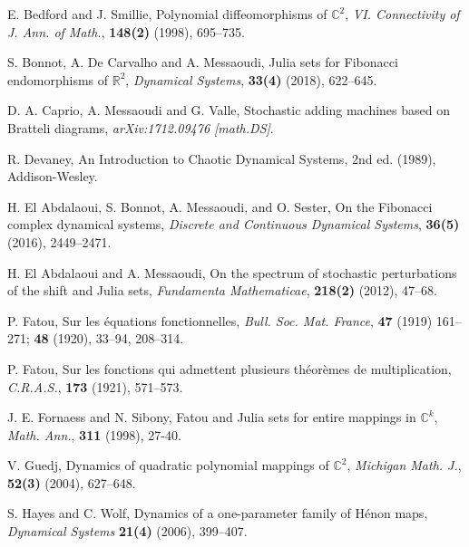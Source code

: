 \documentclass[11pt]{amsart}
\theoremstyle{definition}
\begin{document}
\begin{thebibliography}{99}

\newblock E. Bedford and J. Smillie,
\newblock Polynomial diffeomorphisms of $\mathbb{C}^2$,
\newblock \emph{VI. Connectivity of J. Ann. of Math.}, \textbf{148(2)} (1998), 695--735.

\newblock S. Bonnot, A. De Carvalho and A. Messaoudi,
\newblock Julia sets for Fibonacci endomorphisms of $\mathbb{R}^2$,
\newblock \emph{Dynamical Systems}, \textbf{33(4)} (2018), 622--645. 

\newblock D. A. Caprio, A. Messaoudi and G. Valle,
\newblock Stochastic adding machines based on Bratteli diagrams,
\newblock \emph{arXiv:1712.09476 [math.DS]}.

\newblock R. Devaney,
\newblock An Introduction to Chaotic Dynamical Systems,
\newblock 2nd ed. (1989), Addison-Wesley.

\newblock H. El Abdalaoui, S. Bonnot, A. Messaoudi, and O. Sester,
\newblock On the Fibonacci complex dynamical systems,
\newblock \emph{Discrete and Continuous Dynamical Systems}, \textbf{36(5)} (2016), 2449–2471.

\newblock H. El Abdalaoui and A. Messaoudi,
\newblock On the spectrum of stochastic perturbations of the shift and Julia sets,
\newblock \emph{Fundamenta Mathematicae}, \textbf{218(2)} (2012), 47--68.

\newblock P. Fatou,
\newblock Sur les \'equations fonctionnelles, 
\newblock \emph{Bull. Soc. Mat. France}, \textbf{47} (1919) 161--271; \textbf{48} (1920), 33--94, 208--314.

\newblock  P. Fatou,
\newblock  Sur les fonctions qui admettent plusieurs th\'eor\`emes de multiplication,
\newblock  \emph{C.R.A.S.}, \textbf{173} (1921), 571--573.

\newblock J. E. Fornaess and N. Sibony,
\newblock Fatou and Julia sets for entire mappings in $\mathbb{C}^k$,
\newblock \emph{Math. Ann.}, \textbf{311} (1998), 27-40.

\newblock V. Guedj,
\newblock Dynamics of quadratic polynomial mappings of $\mathbb{C}^2$,
\newblock \emph{Michigan Math. J.}, \textbf{52(3)} (2004), 627--648.

\newblock S. Hayes and C. Wolf,
\newblock Dynamics of a one-parameter family of H\'enon maps,
\newblock \emph{Dynamical Systems} \textbf{21(4)} (2006), 399--407.


\end{thebibliography}
\end{document}
